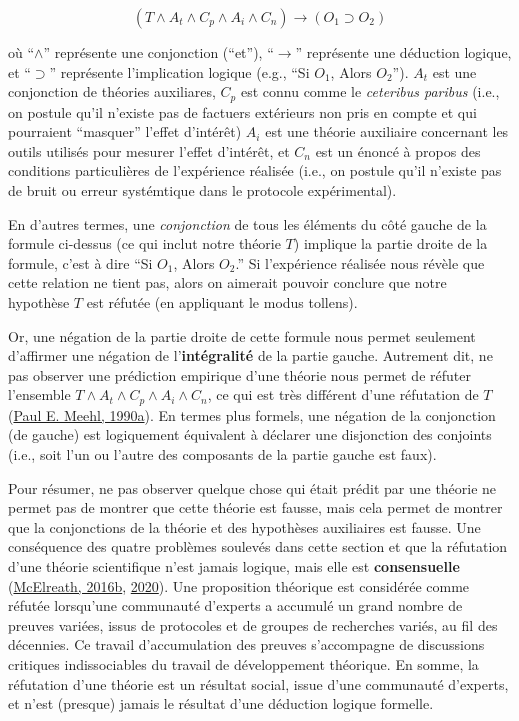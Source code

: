 \documentclass[
  a4paper,11pt,twoside,onecolumn,openright,final,oldfontcommands]{memoir}
\theoremstyle{definition}
\theoremstyle{definition}
\theoremstyle{definition}
\theoremstyle{remark}
\begin{document}
\[(T \land A_{t} \land C_{p} \land A_{i} \land C_{n}) \to (O_{1} \supset O_{2})\]

où ``\(\land\)'' représente une conjonction (``et''), ``\(\to\)'' représente une déduction logique, et ``\(\supset\)'' représente l'implication logique (e.g., ``Si \(O_{1}\), Alors \(O_{2}\)''). \(A_{t}\) est une conjonction de théories auxiliares, \(C_{p}\) est connu comme le \emph{ceteribus paribus} (i.e., on postule qu'il n'existe pas de factuers extérieurs non pris en compte et qui pourraient ``masquer'' l'effet d'intérêt) \(A_{i}\) est une théorie auxiliaire concernant les outils utilisés pour mesurer l'effet d'intérêt, et \(C_{n}\) est un énoncé à propos des conditions particulières de l'expérience réalisée (i.e., on postule qu'il n'existe pas de bruit ou erreur systémtique dans le protocole expérimental).

En d'autres termes, une \emph{conjonction} de tous les éléments du côté gauche de la formule ci-dessus (ce qui inclut notre théorie \(T\)) implique la partie droite de la formule, c'est à dire ``Si \(O_{1}\), Alors \(O_{2}\).'' Si l'expérience réalisée nous révèle que cette relation ne tient pas, alors on aimerait pouvoir conclure que notre hypothèse \(T\) est réfutée (en appliquant le modus tollens).

Or, une négation de la partie droite de cette formule nous permet seulement d'affirmer une négation de l'\textbf{intégralité} de la partie gauche. Autrement dit, ne pas observer une prédiction empirique d'une théorie nous permet de réfuter l'ensemble \(T \land A_{t} \land C_{p} \land A_{i} \land C_{n}\), ce qui est très différent d'une réfutation de \(T\) (\protect\hyperlink{ref-meehl_appraising_1990}{Paul E. Meehl, 1990a}). En termes plus formels, une négation de la conjonction (de gauche) est logiquement équivalent à déclarer une disjonction des conjoints (i.e., soit l'un ou l'autre des composants de la partie gauche est faux).

Pour résumer, ne pas observer quelque chose qui était prédit par une théorie ne permet pas de montrer que cette théorie est fausse, mais cela permet de montrer que la conjonctions de la théorie et des hypothèses auxiliaires est fausse. Une conséquence des quatre problèmes soulevés dans cette section et que la réfutation d'une théorie scientifique n'est jamais logique, mais elle est \textbf{consensuelle} (\protect\hyperlink{ref-mcelreath_statistical_2016}{McElreath, 2016b}, \protect\hyperlink{ref-mcelreath_statistical_2020}{2020}). Une proposition théorique est considérée comme réfutée lorsqu'une communauté d'experts a accumulé un grand nombre de preuves variées, issus de protocoles et de groupes de recherches variés, au fil des décennies. Ce travail d'accumulation des preuves s'accompagne de discussions critiques indissociables du travail de développement théorique. En somme, la réfutation d'une théorie est un résultat social, issue d'une communauté d'experts, et n'est (presque) jamais le résultat d'une déduction logique formelle.
\end{document}
